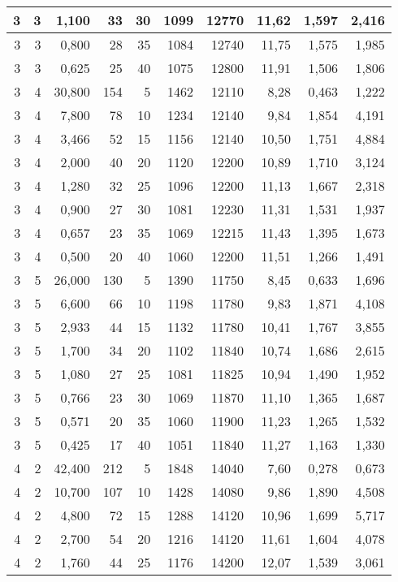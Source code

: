 \begin{tabular}{rrrrrrrrrr}
3 & 3 & 1,100 & 33 & 30 & 1099 & 12770 & 11,62 & 1,597 & 2,416 \\ \hline
3 & 3 & 0,800 & 28 & 35 & 1084 & 12740 & 11,75 & 1,575 & 1,985 \\ \hline
3 & 3 & 0,625 & 25 & 40 & 1075 & 12800 & 11,91 & 1,506 & 1,806 \\ \hline
3 & 4 & 30,800 & 154 & 5 & 1462 & 12110 & 8,28 & 0,463 & 1,222 \\ \hline
3 & 4 & 7,800 & 78 & 10 & 1234 & 12140 & 9,84 & 1,854 & 4,191 \\ \hline
3 & 4 & 3,466 & 52 & 15 & 1156 & 12140 & 10,50 & 1,751 & 4,884 \\ \hline
3 & 4 & 2,000 & 40 & 20 & 1120 & 12200 & 10,89 & 1,710 & 3,124 \\ \hline
3 & 4 & 1,280 & 32 & 25 & 1096 & 12200 & 11,13 & 1,667 & 2,318 \\ \hline
3 & 4 & 0,900 & 27 & 30 & 1081 & 12230 & 11,31 & 1,531 & 1,937 \\ \hline
3 & 4 & 0,657 & 23 & 35 & 1069 & 12215 & 11,43 & 1,395 & 1,673 \\ \hline
3 & 4 & 0,500 & 20 & 40 & 1060 & 12200 & 11,51 & 1,266 & 1,491 \\ \hline
3 & 5 & 26,000 & 130 & 5 & 1390 & 11750 & 8,45 & 0,633 & 1,696 \\ \hline
3 & 5 & 6,600 & 66 & 10 & 1198 & 11780 & 9,83 & 1,871 & 4,108 \\ \hline
3 & 5 & 2,933 & 44 & 15 & 1132 & 11780 & 10,41 & 1,767 & 3,855 \\ \hline
3 & 5 & 1,700 & 34 & 20 & 1102 & 11840 & 10,74 & 1,686 & 2,615 \\ \hline
3 & 5 & 1,080 & 27 & 25 & 1081 & 11825 & 10,94 & 1,490 & 1,952 \\ \hline
3 & 5 & 0,766 & 23 & 30 & 1069 & 11870 & 11,10 & 1,365 & 1,687 \\ \hline
3 & 5 & 0,571 & 20 & 35 & 1060 & 11900 & 11,23 & 1,265 & 1,532 \\ \hline
3 & 5 & 0,425 & 17 & 40 & 1051 & 11840 & 11,27 & 1,163 & 1,330 \\ \hline
4 & 2 & 42,400 & 212 & 5 & 1848 & 14040 & 7,60 & 0,278 & 0,673 \\ \hline
4 & 2 & 10,700 & 107 & 10 & 1428 & 14080 & 9,86 & 1,890 & 4,508 \\ \hline
4 & 2 & 4,800 & 72 & 15 & 1288 & 14120 & 10,96 & 1,699 & 5,717 \\ \hline
4 & 2 & 2,700 & 54 & 20 & 1216 & 14120 & 11,61 & 1,604 & 4,078 \\ \hline
4 & 2 & 1,760 & 44 & 25 & 1176 & 14200 & 12,07 & 1,539 & 3,061 \\ \hline

\end{tabular}
